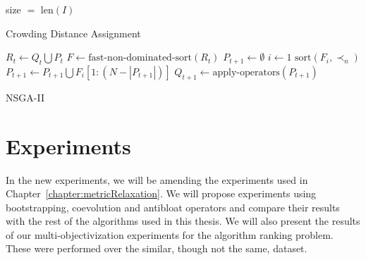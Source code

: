 \IncMargin{1em}
\begin{algorithm}	
	\BlankLine
	size $=$ len$(I)$\;
	\caption{Crowding Distance Assignment}\label{algo:crowdingDistanceAssignment}
\end{algorithm}\DecMargin{1em}
\IncMargin{1em}
\begin{algorithm}
	\BlankLine
	$R_t \leftarrow Q_t \bigcup P_t$\;
	$F \leftarrow \text{fast-non-dominated-sort}(R_t)$\;
	$P_{t+1} \leftarrow \emptyset$\;
	$i \leftarrow 1$\;
	$\text{sort}(F_i,\prec_n)$\;
	$P_{t+1} \leftarrow P_{t+1} \bigcup F_i[1:(N-|P_{t+1}|)]$\;
	$Q_{t+1} \leftarrow \text{apply-operators}(P_{t+1})$\;
	\caption{NSGA-II}\label{algo:nsgaII}
\end{algorithm}\DecMargin{1em}  
 
 \section{Experiments}
In the new experiments, we will be amending the experiments used in Chapter~\ref{chapter:metricRelaxation}. We will propose experiments using bootstrapping, coevolution and antibloat operators and compare their results with the rest of the algorithms used in this thesis. We will also present the results of our multi-objectivization experiments for the algorithm ranking problem. These were performed over the similar, though not the same, dataset.

